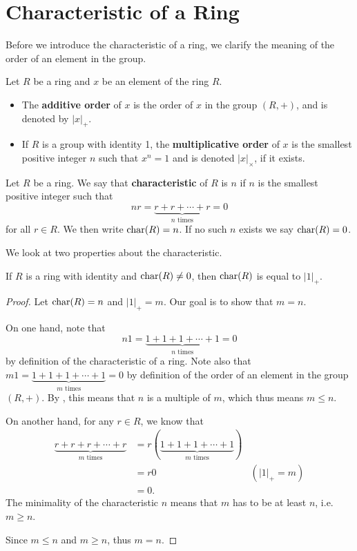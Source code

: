 \section{Characteristic of a Ring}
Before we introduce the characteristic of a ring, we clarify the meaning of the order of an element in the group.
\begin{definition}
    Let $R$ be a ring and $x$ be an element of the ring $R$.
    \begin{itemize}
        \item The \textbf{additive order} of $x$ is the order of $x$ in the group $(R, +)$, and is denoted by $|x|_+$.
        \item If $R$ is a group with identity 1, the \textbf{multiplicative order} of $x$ is the smallest positive integer $n$ such that $x^n = 1$ and is denoted $|x|_\times$, if it exists.
    \end{itemize}
\end{definition}

\begin{definition}
    Let $R$ be a ring. We say that \textbf{characteristic} of $R$ is $n$ if $n$ is the smallest positive integer such that
    \[
        nr = \underbrace{r+r+\cdots+r}_{n \text{ times}} = 0
    \]
    for all $r \in R$. We then write $\mathrm{char}(R) = n$. If no such $n$ exists we say $\mathrm{char}(R) = 0$.
\end{definition}

We look at two properties about the characteristic.
\begin{proposition}
    If $R$ is a ring with identity and $\mathrm{char}(R) \neq 0$, then $\mathrm{char}(R)$ is equal to $|1|_+$.
\end{proposition}
\begin{proof}
    Let $\mathrm{char}(R) = n$ and $|1|_+ = m$. Our goal is to show that $m = n$.

    On one hand, note that
    \[
        n1 = \underbrace{1+1+1+\cdots+1}_{n \text{ times}} = 0
    \]
    by definition of the characteristic of a ring. Note also that $m1 = \underbrace{1+1+1+\cdots+1}_{m \text{ times}} = 0$ by definition of the order of an element in the group $(R, +)$. By , this means that $n$ is a multiple of $m$, which thus means $m \leq n$.

    On another hand, for any $r \in R$, we know that
    \begin{align*}
        \underbrace{r + r + r + \cdots + r}_{m \text{ times}} &= r(\underbrace{1+1+1+\cdots+1}_{m \text{ times}})\\
        &= r0 & (|1|_+ = m)\\
        &= 0.
    \end{align*}
    The minimality of the characteristic $n$ means that $m$ has to be at least $n$, i.e. $m \geq n$.

    Since $m \leq n$ and $m \geq n$, thus $m = n$.
\end{proof}

